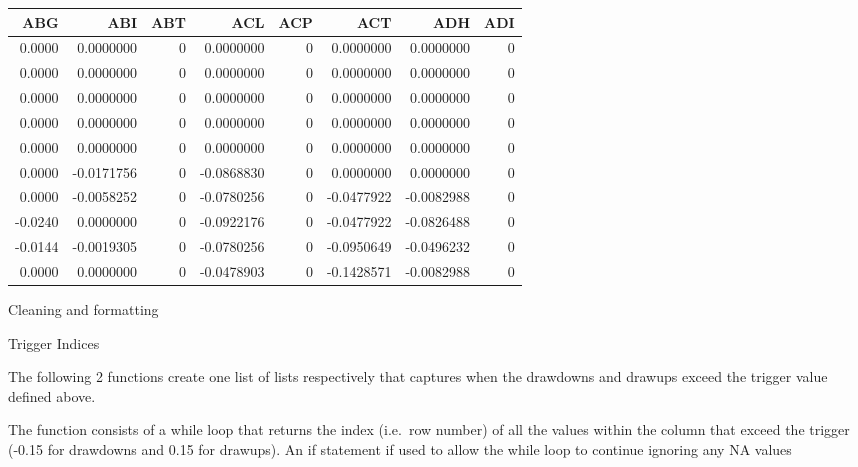 \documentclass[]{article}
\newenvironment{Shaded}{\begin{snugshade}}{\end{snugshade}}
\newcommand{\KeywordTok}[1]{\textcolor[rgb]{0.13,0.29,0.53}{\textbf{#1}}}
\newcommand{\StringTok}[1]{\textcolor[rgb]{0.31,0.60,0.02}{#1}}
\newcommand{\OperatorTok}[1]{\textcolor[rgb]{0.81,0.36,0.00}{\textbf{#1}}}
\newcommand{\NormalTok}[1]{#1}
\begin{document}
\begin{longtable}[]{@{}rrrrrrrr@{}}
\toprule
ABG & ABI & ABT & ACL & ACP & ACT & ADH & ADI\tabularnewline
\midrule
\endhead
0.0000 & 0.0000000 & 0 & 0.0000000 & 0 & 0.0000000 & 0.0000000 &
0\tabularnewline
0.0000 & 0.0000000 & 0 & 0.0000000 & 0 & 0.0000000 & 0.0000000 &
0\tabularnewline
0.0000 & 0.0000000 & 0 & 0.0000000 & 0 & 0.0000000 & 0.0000000 &
0\tabularnewline
0.0000 & 0.0000000 & 0 & 0.0000000 & 0 & 0.0000000 & 0.0000000 &
0\tabularnewline
0.0000 & 0.0000000 & 0 & 0.0000000 & 0 & 0.0000000 & 0.0000000 &
0\tabularnewline
0.0000 & -0.0171756 & 0 & -0.0868830 & 0 & 0.0000000 & 0.0000000 &
0\tabularnewline
0.0000 & -0.0058252 & 0 & -0.0780256 & 0 & -0.0477922 & -0.0082988 &
0\tabularnewline
-0.0240 & 0.0000000 & 0 & -0.0922176 & 0 & -0.0477922 & -0.0826488 &
0\tabularnewline
-0.0144 & -0.0019305 & 0 & -0.0780256 & 0 & -0.0950649 & -0.0496232 &
0\tabularnewline
0.0000 & 0.0000000 & 0 & -0.0478903 & 0 & -0.1428571 & -0.0082988 &
0\tabularnewline
\bottomrule
\end{longtable}

Cleaning and formatting

\begin{Shaded}
\end{Shaded}

Trigger Indices

The following 2 functions create one list of lists respectively that
captures when the drawdowns and drawups exceed the trigger value defined
above.

The function consists of a while loop that returns the index (i.e.~row
number) of all the values within the column that exceed the trigger
(-0.15 for drawdowns and 0.15 for drawups). An if statement if used to
allow the while loop to continue ignoring any NA values
\end{document}
